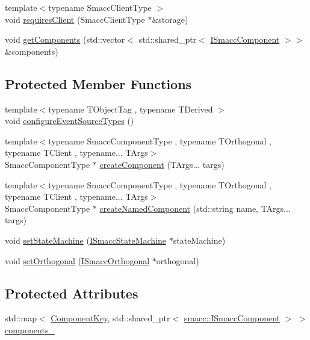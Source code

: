 \begin{DoxyCompactItemize}
\item 
{\footnotesize template$<$typename Smacc\+Client\+Type $>$ }\\void \hyperlink{classsmacc_1_1ISmaccClient_a7a9990a2f3e35d547671188d69fee520}{requires\+Client} (Smacc\+Client\+Type $\ast$\&storage)
\item 
void \hyperlink{classsmacc_1_1ISmaccClient_ac6db21c1ec7072178e9f7c721908e07d}{get\+Components} (std\+::vector$<$ std\+::shared\+\_\+ptr$<$ \hyperlink{classsmacc_1_1ISmaccComponent}{I\+Smacc\+Component} $>$$>$ \&components)
\end{DoxyCompactItemize}
\subsection*{Protected Member Functions}
\begin{DoxyCompactItemize}
\item 
{\footnotesize template$<$typename T\+Object\+Tag , typename T\+Derived $>$ }\\void \hyperlink{classsmacc_1_1ISmaccClient_a643285b93f2bd33987e0d0d1a12caf10}{configure\+Event\+Source\+Types} ()
\item 
{\footnotesize template$<$typename Smacc\+Component\+Type , typename T\+Orthogonal , typename T\+Client , typename... T\+Args$>$ }\\Smacc\+Component\+Type $\ast$ \hyperlink{classsmacc_1_1ISmaccClient_a5c1c8eb5e91a3b399662a52cb0ca86aa}{create\+Component} (T\+Args... targs)
\item 
{\footnotesize template$<$typename Smacc\+Component\+Type , typename T\+Orthogonal , typename T\+Client , typename... T\+Args$>$ }\\Smacc\+Component\+Type $\ast$ \hyperlink{classsmacc_1_1ISmaccClient_affcc2f95bc993b5f07ef0d6ab6eec8f1}{create\+Named\+Component} (std\+::string name, T\+Args... targs)
\item 
void \hyperlink{classsmacc_1_1ISmaccClient_a28fd6ca2bcf9c5e57f3cc16fb0a076d3}{set\+State\+Machine} (\hyperlink{classsmacc_1_1ISmaccStateMachine}{I\+Smacc\+State\+Machine} $\ast$state\+Machine)
\item 
void \hyperlink{classsmacc_1_1ISmaccClient_a40330788a976dc08e2f726d210564ec4}{set\+Orthogonal} (\hyperlink{classsmacc_1_1ISmaccOrthogonal}{I\+Smacc\+Orthogonal} $\ast$orthogonal)
\end{DoxyCompactItemize}
\subsection*{Protected Attributes}
\begin{DoxyCompactItemize}
\item 
std\+::map$<$ \hyperlink{structsmacc_1_1ComponentKey}{Component\+Key}, std\+::shared\+\_\+ptr$<$ \hyperlink{classsmacc_1_1ISmaccComponent}{smacc\+::\+I\+Smacc\+Component} $>$ $>$ \hyperlink{classsmacc_1_1ISmaccClient_a9e670e9071bb549dbeb08985d0114afe}{components\+\_\+}
\end{DoxyCompactItemize}
